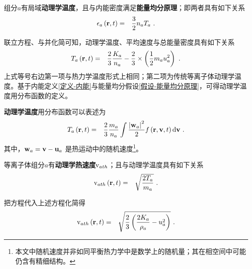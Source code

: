   \begin{assumption} \label{假设-能量均分原理}
      组分$a$有局域\textbf{动理学温度}，且与内能密度满足\textbf{能量均分原理}；即两者具有如下关系
      \begin{eqnarray}
        \epsilon_a \left(\mathbf{r},t \right) &=& \frac{3}{2} n_a T_a ~. \label{epsilonaTa}
      \end{eqnarray}
  \end{assumption}
  \noindent
  联立方程、与并化简可知，动理学温度、平均速度与总能量密度具有如下关系
  \begin{eqnarray}
      T_a \left(\mathbf{r},t \right)  &=& \frac{2}{3}  \frac{K_a}{n_a}  -  \frac{2}{3} \times \left ( \frac{1}{2} m_a u_a^2 \right)  ~.  \label{TaM}
  \end{eqnarray}
  上式等号右边第一项与热力学温度形式上相同；第二项为传统等离子体动理学温度。基于内能定义\ref{定义-内能}与能量均分假设\ref{假设-能量均分原理}，可得动理学温度用分布函数的定义。
  
  \begin{definition} \label{定义-动理学温度}
      \textbf{动理学温度}用分布函数可以表述为
      \begin{eqnarray}
        T_a \left(\mathbf{r},t \right) &=& \frac{2}{3} \frac{m_a}{n_a} \int \frac{\left | \mathbf{w}_a \right|^2}{2} f \left(\mathbf{r},\mathbf{v},t \right) \mathrm{d} \mathbf{v} ~. \label{TaKa}
      \end{eqnarray}
      其中，$\mathbf{w}_a = \mathbf{v} - \mathbf{u}_a$ 是热运动中的随机速度\footnote{本文中随机速度并非如同平衡热力学中是数学上的随机量；其在相空间中可能仍含有精细结构。}。
  \end{definition}
  \noindent
  
  \begin{definition} \label{定义-热速度}
      等离子体组分$a$有\textbf{动理学热速度}$\mathrm{v}_{ath}$；且与动理学温度具有如下关系
      \begin{eqnarray}
        \mathrm{v}_{ath} \left(\mathbf{r},t \right) &=& \sqrt{\frac{2 T_a}{m_a}} ~. \label{vath}
      \end{eqnarray}
  \end{definition}
  \noindent
  把方程代入上述方程化简得
      \begin{eqnarray}
        \mathrm{v}_{ath} \left(\mathbf{r},t \right) &=& \sqrt{\frac{2}{3} \left (\frac{2K_a}{\rho_a} - u_a^2 \right)} ~. \label{vathKu}
      \end{eqnarray}
  
